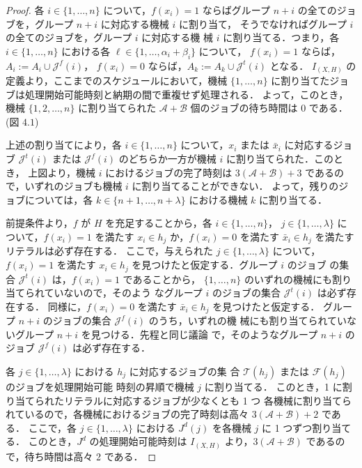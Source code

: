 \documentclass[12pt]{optlab-bachelor}
\begin{document}
\begin{proof}
  各 $i \in \{1,\ldots, n\}$ について，$f(x_i) = 1$ ならばグループ $n +
  i$ の全てのジョブを，グループ $n + i$ に対応する機械 $i$ に割り当て，
  そうでなければグループ $i$ の全てのジョブを，グループ $i$ に対応する機
  械 $i$ に割り当てる．つまり，各 $i \in \{1,\ldots, n\}$ における各
  $\ell \in \{1,\ldots,\alpha_i + \beta_i\}$ について，
  $f(x_i) = 1$ ならば，$A_i := A_i \cup \mathcal{J}^f(i)$，
  $f(x_i) = 0$ ならば，$A_k := A_k \cup \mathcal{J}^t(i)$ となる．
  $I_{(X,H)}$ の定義より，ここまでのスケジュールにおいて，機械
  $\{1,\ldots, n\}$ に割り当てたジョブは処理開始可能時刻と納期の間で重複せず処理される．
  よって，このとき，機械 $\{1,2,\ldots,n\}$ に割り当てられた
  $\mathcal{A} + \mathcal{B}$ 個のジョブの待ち時間は $0$ である．(図 $4.1$)

  上述の割り当てにより，各 $i \in \{1,\ldots,n\}$ について，$x_i$ または
  $\bar x_i$ に対応するジョブ $\mathcal{J}^t(i)$ または
  $\mathcal{J}^f(i)$ のどちらか一方が機械 $i$ に割り当てられた．このとき，
  上図より，機械 $i$ におけるジョブの完了時刻は $3(\mathcal{A} +
  \mathcal{B}) + 3$ であるので，いずれのジョブも機械 $i$ に割り当てることができない．
  よって，残りのジョブについては，各 $k \in \{n + 1,\ldots,n +
  \lambda\}$ における機械 $k$ に割り当てる．

  前提条件より，$f$ が $H$ を充足することから，各 $i \in \{1,\ldots,n\}$，
  $j \in \{1, \ldots, \lambda \}$ について，$f(x_i) = 1$ を満たす $x_i
  \in h_j$ か，$f(x_i) = 0$ を満たす $\bar x_i \in h_j$ を満たすリテラルは必ず存在する．
  ここで，与えられた $j \in \{1, \ldots, \lambda \}$ について，$f(x_i) =
  1$ を満たす $x_i \in h_j$ を見つけたと仮定する．グループ $i$ のジョブ
  の集合 $\mathcal{J}^t(i)$ は，$f(x_i) = 1$ であることから，
  $\{1,\ldots,n\}$ のいずれの機械にも割り当てられていないので，そのよう
  なグループ $i$ のジョブの集合 $\mathcal{J}^t(i)$ は必ず存在する．
  同様に，$f(x_i) = 0$ を満たす $\bar x_i \in h_j$ を見つけたと仮定する．
  グループ $n + i$ のジョブの集合 $\mathcal{J}^f(i)$ のうち，いずれの機
  械にも割り当てられていないグループ $n + i$ を見つける．先程と同じ議論
  で，そのようなグループ $n + i$ のジョブ $\mathcal{J}^f(i)$ は必ず存在する．

  各 $j \in \{1, \ldots, \lambda \}$ における $h_j$ に対応するジョブの集
  合 $\mathcal{T}(h_j)$ または $\mathcal{F}(h_j)$ のジョブを処理開始可能
  時刻の昇順で機械 $j$ に割り当てる．
  このとき，1 に割り当てられたリテラルに対応するジョブが少なくとも 1 つ
  各機械に割り当てられているので，各機械におけるジョブの完了時刻は高々
  $3(\mathcal{A} + \mathcal{B}) + 2$ である．
  ここで，各 $j \in \{1,\ldots,\lambda\}$ における $J^d(j)$ を各機械 $j$
  に 1 つずつ割り当てる．
  このとき，$J^d$ の処理開始可能時刻は $I_{(X,H)}$ より，$3(\mathcal{A}
  + \mathcal{B})$ であるので，待ち時間は高々 2 である．


\end{proof}
\end{document}
